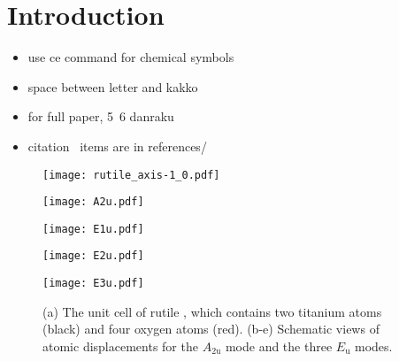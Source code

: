 \documentclass[luatex,twocolumn,showpacs,aps,prb,reprint,amsfonts,amsmath,amssymb,floatfix,groupedaddress, longbibliography]{revtex4-2}
\begin{document}
\section{Introduction}\label{sec:intro}

\lipsum[1-10]

\begin{itemize}
 \item use ce command for chemical symbols
 \item space between letter and kakko
 \item for full paper, 5~6 danraku
 \item citation~\cite{abrahams1971Rutile} items are in references/
\end{itemize}


\begin{figure}[t]
\hfill
\centering
\begin{subcaptionblock}{0.6\linewidth}
\centering
\texttt{[image: rutile\_axis-1\_0.pdf]}
\subcaption{}
\end{subcaptionblock}\hfill
\begin{subcaptionblock}{0.4\linewidth}
\centering
\texttt{[image: A2u.pdf]}
\end{subcaptionblock}\hfill
\begin{subcaptionblock}{0.3\linewidth}
\centering
\texttt{[image: E1u.pdf]}
\end{subcaptionblock}\hfill
\begin{subcaptionblock}{0.3\linewidth}
\centering
\texttt{[image: E2u.pdf]}
\end{subcaptionblock}\hfill
\begin{subcaptionblock}{0.3\linewidth}
\centering
\texttt{[image: E3u.pdf]}
\end{subcaptionblock}\hfill
\caption{(a) The unit cell of rutile , which contains two titanium atoms (black) and four oxygen atoms (red). (b-e) Schematic views of atomic displacements for the $A_{\mathrm{2u}}$ mode and the three $E_{\mathrm{u}}$ modes. }
\label{fig:crystal}
\end{figure}
\end{document}
